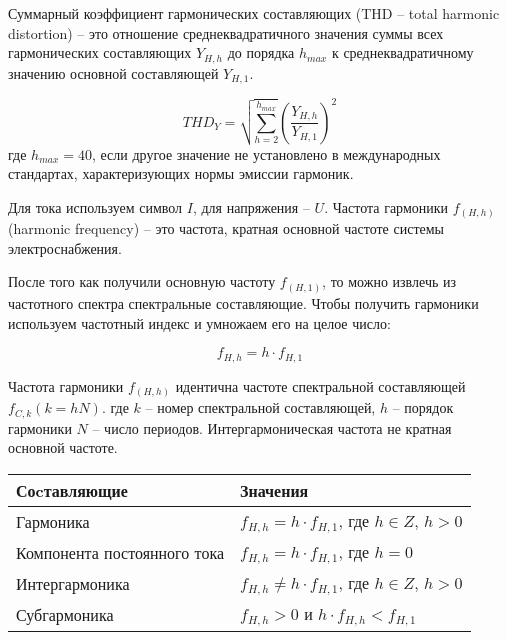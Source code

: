 Суммарный коэффициент гармонических составляющих (THD – total harmonic distortion) – это отношение среднеквадратичного значения суммы всех гармонических составляющих $Y_{H,h}$ до порядка $h_{max}$ к среднеквадратичному значению основной составляющей $Y_{H,1}$. 

\begin{equation}
	\label{eq:equation1.9}
THD_{Y} = \sqrt{\displaystyle\sum_{h=2}^{h_{max}}} (\frac{Y_{H,h}}{Y_{H,1}})^2
\end{equation} 
где $h_{max}=40$, если другое значение не установлено в международных стандартах, характеризующих нормы эмиссии гармоник.

Для тока используем символ $I$, для напряжения – $U$.
Частота гармоники $f_{(H,h)}$ (harmonic frequency) – это частота, кратная основной частоте системы электроснабжения.

После того как получили основную частоту $f_{(H,1)}$, то можно извлечь из частотного спектра спектральные составляющие. Чтобы получить гармоники используем частотный индекс и умножаем его на целое число:

\begin{equation}
	\label{eq:equation1.10}
	f_{H,h} = h \cdot f_{H,1}
\end{equation} 

Частота гармоники $f_{(H,h)}$ идентична частоте спектральной составляющей $f_{C,k}(k=hN)$.
где $k$ – номер спектральной составляющей, $h$  – порядок гармоники $N$ – число периодов.
Интергармоническая частота не кратная основной частоте.

\begin{table}[ht]
	\caption{Спектральные составляющие волны}%
	\label{tbl:test1_1}%
	\fontsize{14pt}{14pt}\selectfont
	\begin{longtable*}[c]{|l|l|} 
		\hline
		Соcтавляющие & Значения \\
		\hline
		Гармоника &
    	$f_{H,h}=h\cdot f_{H,1}$, где $h \in Z$, $h>0$
 \\
    	
    	Компонента постоянного тока &
    	$f_{H,h}=h\cdot f_{H,1}$, где $h = 0 $
 \\
    	
    	Интергармоника &
    	$f_{H,h}\neq h\cdot f_{H,1}$, где $h \in Z$, $h>0$  \\
    	
    	Субгармоника &
    	$f_{H,h} > 0$ и $h\cdot f_{H,h} < f_{H,1}$ \\
		\hline
	\end{longtable*}
\end{table}

